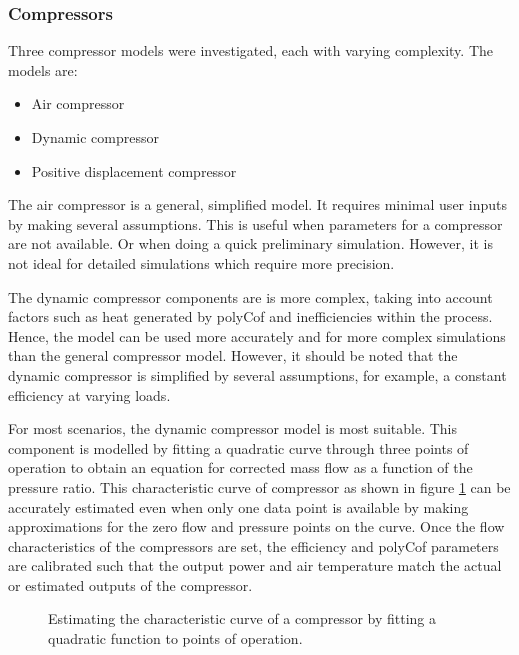 		\subsubsection{Compressors}
		Three compressor models were investigated, each with varying complexity. The models are:
		\begin{itemize}
			\item Air compressor
			\item Dynamic compressor 
			\item Positive displacement compressor
		\end{itemize}  
		The air compressor is a general, simplified model. It requires minimal user inputs by making several assumptions. This is useful when parameters for a compressor are not available. Or when doing a quick preliminary simulation. However, it is not ideal for detailed simulations which require more precision. 
		\par 
		The dynamic compressor components are is more complex, taking into account factors such as heat generated by \gls{polyCof} and inefficiencies within the process. Hence, the model can be used more accurately and for more complex simulations than the general compressor model. However, it should be noted that the dynamic compressor is simplified by several assumptions, for example, a constant efficiency at varying loads. 
		\par 	 
		For most scenarios, the dynamic compressor model is most suitable. This component is modelled by fitting a quadratic curve through three points of operation to obtain an equation for corrected mass flow as a function of the pressure ratio. This characteristic curve of compressor  as shown in figure \ref{fig: Compressor Curve} can be accurately estimated even when only one data point is available by making approximations for the zero flow and pressure points on the curve. Once the flow characteristics of the compressors are set, the efficiency and \gls{polyCof} parameters are calibrated such that the output power and air temperature match the actual or estimated outputs of the compressor.
		
		\begin{figure}[h]
			\centering
			\fbox{}
			\caption{Estimating the characteristic curve of a compressor by fitting a quadratic function to points of operation.}
			\label{fig: Compressor Curve}
		\end{figure}

